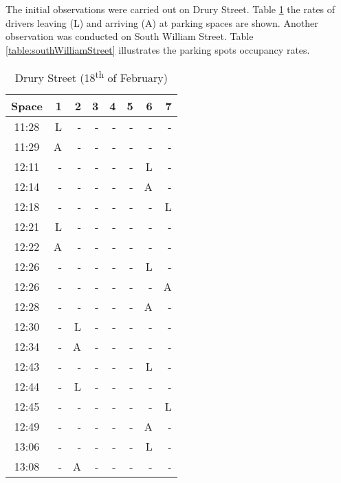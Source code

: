 The initial observations were carried out on Drury Street. Table \ref{table:druryStreet} the rates of drivers leaving (L) and arriving (A) at parking spaces are shown. Another observation was conducted on South William Street. Table \ref{table:southWilliamStreet} illustrates the parking spots occupancy rates.
\begin{table}[H]
    \centering
    \setlength\tabcolsep{4pt}
    \begin{minipage}{0.48\textwidth}
        \centering
        \begin{tabular}{|c|r|r|r|r|r|r|r|}
            \hline
            Space & 1 & 2 & 3 & 4 & 5 & 6 & 7 \\
            \hline\hline
            11:28 & L & - & - & - & - & - & - \\ \hline
            11:29 & A & - & - & - & - & - & - \\ \hline
            12:11 & - & - & - & - & - & L & - \\ \hline
            12:14 & - & - & - & - & - & A & - \\ \hline
            12:18 & - & - & - & - & - & - & L \\ \hline
            12:21 & L & - & - & - & - & - & - \\ \hline
            12:22 & A & - & - & - & - & - & - \\ \hline
            12:26 & - & - & - & - & - & L & - \\ \hline
            12:26 & - & - & - & - & - & - & A \\ \hline
            12:28 & - & - & - & - & - & A & - \\ \hline
            12:30 & - & L & - & - & - & - & - \\ \hline
            12:34 & - & A & - & - & - & - & - \\ \hline
            12:43 & - & - & - & - & - & L & - \\ \hline
            12:44 & - & L & - & - & - & - & - \\ \hline
            12:45 & - & - & - & - & - & - & L \\ \hline
            12:49 & - & - & - & - & - & A & - \\ \hline
            13:06 & - & - & - & - & - & L & - \\ \hline
            13:08 & - & A & - & - & - & - & - \\
            \hline
        \end{tabular}
        \caption{Drury Street (18\textsuperscript{th} of February)}
        \label{table:druryStreet} 

\end{minipage}
\end{table}
